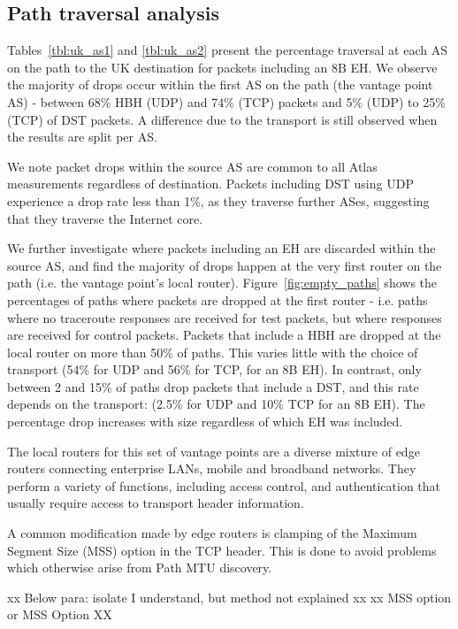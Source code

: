 \documentclass[conference]{IEEEtran}
\begin{document}
\subsection{Path traversal analysis}

Tables~\ref{tbl:uk_as1} and \ref{tbl:uk_as2} present the percentage traversal at each AS on the path to the UK destination for packets including an 8B EH. We observe the majority of drops occur within the first AS on the path (the vantage point AS) - between 68\% HBH (UDP) and 74\% (TCP) packets and 5\% (UDP) to 25\% (TCP) of DST packets. A difference due to the transport is still observed when the results are split per AS. 

We note packet drops within the source AS are common to all Atlas measurements regardless of destination. Packets including DST using UDP experience a drop rate less than 1\%, as they traverse further  ASes, suggesting that they traverse the Internet core.

We further investigate where packets  including an EH are discarded within the source AS, and find the majority of drops happen at the very first router on the path (i.e. the vantage point's local router).
Figure~\ref{fig:empty_paths} shows the percentages of paths where packets are dropped at the first router - i.e. paths where no traceroute responses are received for test packets, but where responses are received for control packets. Packets that include a HBH are dropped at the local router on more than 50\% of paths. This varies little with the choice of transport (54\% for UDP and 56\% for TCP, for an 8B EH). In contrast, only between 2 and 15\% of paths drop packets that include a DST, and this rate depends on the transport: (2.5\% for UDP and 10\% TCP for an 8B EH). The percentage drop increases with size regardless of which EH was included.


The local routers for this set of vantage points are a diverse mixture of edge routers connecting enterprise LANs, mobile and broadband networks. They perform a variety of functions, including access control, and authentication that usually require access to transport header information. 



A common modification made by edge routers is clamping of the Maximum Segment Size (MSS) option in the TCP header. This is done to avoid problems which otherwise arise from Path MTU discovery. 

xx Below para: isolate I understand, but method not explained xx
xx MSS option or MSS Option XX
\end{document}
